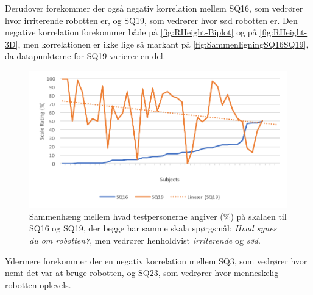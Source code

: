\noindent
%
Derudover forekommer der også negativ korrelation mellem SQ16, som vedrører hvor irriterende robotten er, og SQ19, som vedrører hvor sød robotten er. Den negative korrelation forekommer både på \autoref{fig:RHeight-Biplot} og på \autoref{fig:RHeight-3D}, men korrelationen er ikke lige så markant på \autoref{fig:SammenligningSQ16SQ19}, da datapunkterne for SQ19 varierer en del.  
%
\begin{figure}[H]
	\centering
	\includegraphics[width=\textwidth]{Figure/Korrelationsgrafer/SQ16+SQ19}
	\caption{Sammenhæng mellem hvad testpersonerne angiver (\%) på skalaen til SQ16 og SQ19, der begge har samme skala spørgsmål: \textit{Hvad synes du om robotten?}, men vedrører henholdvist \textit{irriterende} og \textit{sød}.}
	\label{fig:SammenligningSQ16SQ19}
\end{figure}
\noindent
%
Ydermere forekommer der en negativ korrelation mellem SQ3, som vedrører hvor nemt det var at bruge robotten, og SQ23, som vedrører hvor menneskelig robotten oplevels.
%

